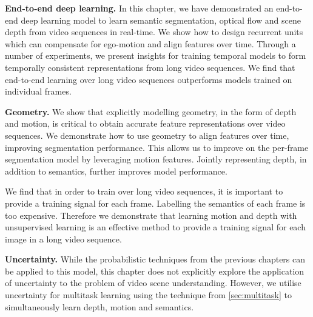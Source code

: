 \textbf{End-to-end deep learning.}
In this chapter, we have demonstrated an end-to-end deep learning model to learn semantic segmentation, optical flow and scene depth from video sequences in real-time. We show how to design recurrent units which can compensate for ego-motion and align features over time. Through a number of experiments, we present insights for training temporal models to form temporally consistent representations from long video sequences. We find that end-to-end learning over long video sequences outperforms models trained on individual frames.

\textbf{Geometry.}
We show that explicitly modelling geometry, in the form of depth and motion, is critical to obtain accurate feature representations over video sequences. We demonstrate how to use geometry to align features over time, improving segmentation performance. This allows us to improve on the per-frame segmentation model by leveraging motion features. Jointly representing depth, in addition to semantics, further improves model performance.

We find that in order to train over long video sequences, it is important to provide a training signal for each frame. Labelling the semantics of each frame is too expensive. Therefore we demonstrate that learning motion and depth with unsupervised learning is an effective method to provide a training signal for each image in a long video sequence.

\textbf{Uncertainty.}
While the probabilistic techniques from the previous chapters can be applied to this model, this chapter does not explicitly explore the application of uncertainty to the problem of video scene understanding. However, we utilise uncertainty for multitask learning using the technique from \cref{sec:multitask} to simultaneously learn depth, motion and semantics.

